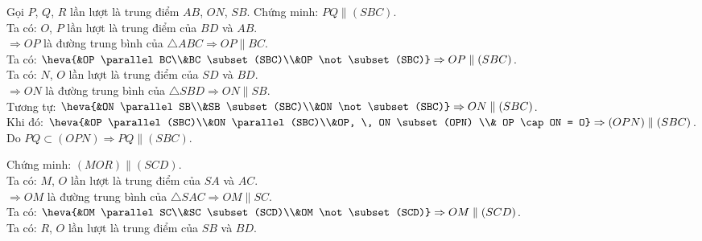 \begin{bt}
{\begin{listEX}
{}
\item Gọi $P$, $Q$, $R$ lần lượt là trung điểm $AB$, $ON$, $SB$. Chứng minh: $PQ \parallel (SBC)$.\\
Ta có: $O$, $P$ lần lượt là trung điểm của $BD$ và $AB$.\\
$\Rightarrow OP $ là đường trung bình của $\triangle ABC \Rightarrow OP \parallel BC$.\\
Ta có: $\heva{&OP \parallel BC\\&BC \subset (SBC)\\&OP \not\subset (SBC)} \Rightarrow OP \parallel (SBC)$.\\
Ta có: $N$, $O$ lần lượt là trung điểm của $SD$ và $BD$.\\
$\Rightarrow ON $ là đường trung bình của $\triangle SBD \Rightarrow ON \parallel SB$.\\
Tương tự: $\heva{&ON \parallel SB\\&SB \subset (SBC)\\&ON \not\subset (SBC)} \Rightarrow ON \parallel (SBC)$.\\
Khi đó: $\heva{&OP \parallel (SBC)\\&ON \parallel (SBC)\\&OP, \, ON \subset (OPN) \\& OP \cap ON = O} \Rightarrow (OPN) \parallel (SBC)$.\\
Do $PQ \subset (OPN) \Rightarrow PQ \parallel (SBC)$.
\item Chứng minh: $(MOR) \parallel (SCD)$.\\
Ta có: $M$, $O$ lần lượt là trung điểm của $SA$ và $AC$.\\
$\Rightarrow OM $ là đường trung bình của $\triangle SAC \Rightarrow OM \parallel SC$.\\
Ta có: $\heva{&OM \parallel SC\\&SC \subset (SCD)\\&OM \not\subset (SCD)} \Rightarrow OM \parallel (SCD)$.\\
Ta có: $R$, $O$ lần lượt là trung điểm của $SB$ và $BD$.\\

\end{listEX}}
\end{bt}

